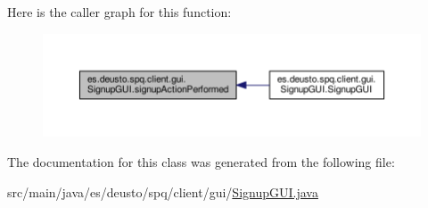 Here is the caller graph for this function\+:\nopagebreak
\begin{figure}[H]
\begin{center}
\leavevmode
\includegraphics[width=350pt]{classes_1_1deusto_1_1spq_1_1client_1_1gui_1_1_signup_g_u_i_a66051677d5a7b866ae8c32875d84c78b_icgraph}
\end{center}
\end{figure}




The documentation for this class was generated from the following file\+:\begin{DoxyCompactItemize}
\item 
src/main/java/es/deusto/spq/client/gui/\hyperlink{_signup_g_u_i_8java}{Signup\+G\+U\+I.\+java}\end{DoxyCompactItemize}
